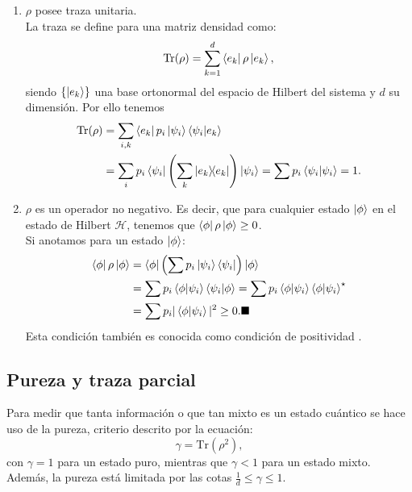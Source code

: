 \documentclass[letterpaper,12pt]{thesisECFM}
\theoremstyle{plain}
\theoremstyle{definition}
\theoremstyle{definition}
\theoremstyle{remark}
\newcommand{\1}{\mathbb{1}}
\begin{document}
\begin{enumerate}
\item $\rho$ posee traza unitaria.\\
La traza se define para una matriz densidad como:
\begin{equation}
    \label{ec:1.18}
    \text{Tr}(\rho) = \sum_{k=1}^{d} \bra{e_k} \rho \ket{e_k},
\end{equation}
siendo $\{\ket{e_k}\}$ una base ortonormal del espacio de Hilbert del sistema y $d$ su
dimensión. Por ello tenemos
\begin{align}
    \text{Tr}(\rho) & = \sum_{i,k} \bra{e_k}p_i\ket{\psi_i} \braket{\psi_i}{e_k} \\
    & = \sum_i p_i \bra{\psi_i} \left( \sum_k \ketbra{e_k} \right) \ket{\psi_i}
= \sum{p_i} \braket{\psi_i} = 1.
\end{align}
\item $\rho$ es un operador no negativo. Es decir, que para cualquier estado $\ket{\phi}$ en el estado de Hilbert $\mathcal{H}$, tenemos que $\bra{\phi}\rho\ket{\phi} \geq 0$.\\
Si anotamos para un estado $\ket{\phi}$:
\begin{align}
\bra{\phi}\rho\ket{\phi} & = \bra{\phi} \left(\sum p_i \ket{\psi_i} \bra{\psi_i}   \right)     \ket{\phi}\\
& = \sum p_i \bra{\phi}\ket{\psi_i}\bra{\psi_i}\ket{\phi}  = \sum p_i \bra{\phi}\ket{\psi_i} \bra{\phi}\ket{\psi_i}^{\star}\\
& = \sum p_i |\bra{\phi}\ket{\psi_i}| ^2 \geq 0. \blacksquare
\end{align}  
Esta condición también es conocida como condición de positividad \cite{nielsen_chuang_2011}.
\end{enumerate}

\subsection{Pureza y traza parcial} %
Para medir que tanta información o que tan mixto es un estado cuántico se hace uso de la pureza, criterio descrito por la ecuación:
\begin{equation}
    \label{ec::1.25}
    \gamma = \text{Tr}(\rho ^2),
\end{equation}
con $\gamma=1$ para un estado puro, mientras que $\gamma < 1$ para un estado
mixto. Además, la pureza está limitada por las cotas $ \frac{1}{d}\leq\gamma\leq 1$. 
  
\end{document}
